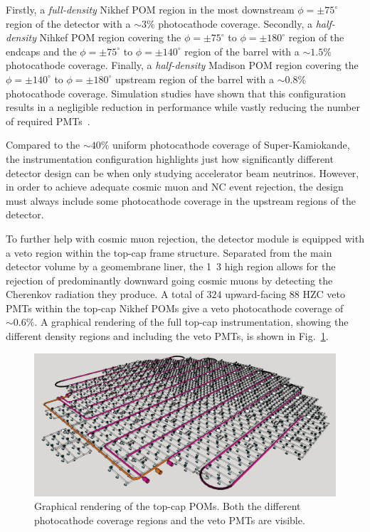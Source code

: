 Firstly, a \emph{full-density} Nikhef POM region in the most downstream $\phi=\pm75^{\circ}$
region of the detector with a $\sim3\%$ photocathode coverage. Secondly, a \emph{half-density}
Nihkef POM region covering the $\phi=\pm75^{\circ}$ to $\phi=\pm180^{\circ}$ region of the endcaps
and the $\phi=\pm75^{\circ}$ to $\phi=\pm140^{\circ}$ region of the barrel with a $\sim1.5\%$
photocathode coverage. Finally, a \emph{half-density} Madison POM region covering the
$\phi=\pm140^{\circ}$ to $\phi=\pm180^{\circ}$ upstream region of the barrel with a $\sim0.8\%$
photocathode coverage. Simulation studies have shown that this configuration results in a
negligible reduction in performance while vastly reducing the number of required
PMTs~\cite{blake2016}.

Compared to the $\sim40\%$ uniform photocathode coverage of Super-Kamiokande, the \chipsfive
instrumentation configuration highlights just how significantly different detector design can be
when only studying accelerator beam neutrinos. However, in order to achieve adequate cosmic muon
and NC event rejection, the design must always include some photocathode coverage in the upstream
regions of the detector.

To further help with cosmic muon rejection, the \chipsfive detector module is equipped with a veto
region within the top-cap frame structure. Separated from the main detector volume by a
geomembrane liner, the \unit{1.3}{} high region allows for the rejection of
predominantly downward going cosmic muons by detecting the Cherenkov radiation they produce. A
total of $324$ upward-facing \unit{88}{} HZC veto PMTs within the top-cap Nikhef POMs
give a veto photocathode coverage of $\sim0.6\%$. A graphical rendering of the full top-cap
instrumentation, showing the different density regions and including the veto PMTs, is shown in
Fig.~\ref{fig:top_cap}.

\begin{figure} %
    \includegraphics[width=\textwidth]{diagrams/4-chips/top_cap.pdf}
    \caption[Graphical rendering of the top-cap Planar Optical Modules]
    {Graphical rendering of the top-cap POMs. Both the different photocathode coverage regions and
        the veto PMTs are visible.}
    \label{fig:top_cap}
\end{figure}

